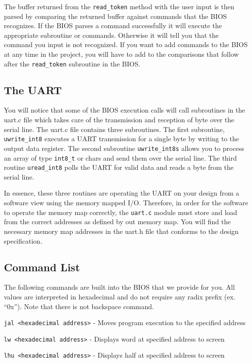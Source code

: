 \documentclass[11pt]{article}
\begin{document}
The buffer returned from the \verb|read_token| method with the user input is then parsed by
comparing the returned buffer against commands that the BIOS recognizes. If the BIOS parses a
command successfully it will execute the appropriate subroutine or commands. Otherwise it
will tell you that the command you input is not recognized.
If you want to add commands to the BIOS at any time in the project, you will have to add to the
comparisons that follow after the \verb|read_token| subroutine in the BIOS.

\subsection{The UART}
You will notice that some of the BIOS execution calls will call subroutines in the uart.c file
which takes care of the transmission and reception of byte over the serial line.
The uart.c file contains three subroutines. The first subroutine, \verb|uwrite_int8| executes a
UART transmission for a single byte by writing to the output data register. The second
subroutine \verb|uwrite_int8s| allows you to process an array of type \verb|int8_t| or chars and send
them over the serial line. The third routine \verb|uread_int8| polls the UART for valid data and
reads a byte from the serial line.

In essence, these three routines are operating the UART on your design from a software view
using the memory mapped I/O. Therefore, in order for the software to operate the memory
map correctly, the \verb|uart.c| module must store and load from the correct addresses as defined
by out memory map. You will find the necessary memory map addresses in the uart.h file that
conforms to the design specification.

\subsection{Command List}
The following commands are built into the BIOS that we provide for you. All values are
interpreted in hexadecimal and do not require any radix prefix (ex. ``0x''). Note that there is not
backspace command.

\verb|jal <hexadecimal address>| - Moves program execution to the specified address

\verb|lw <hexadecimal address>| - Displays word at specified address to screen

\verb|lhu <hexadecimal address>| - Displays half at specified address to screen
\end{document}
